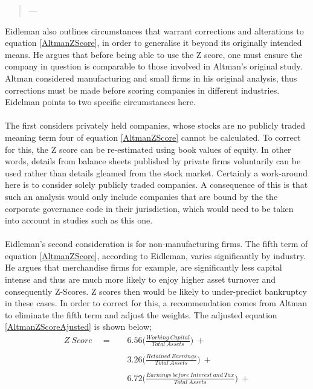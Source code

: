 {\begin {quote}
\hspace{2cm}---  \cite {eidleman1995z}
\end{quote}
Eidleman also outlines circumstances that warrant corrections and alterations to equation \ref{AltmanZScore}, in order to generalise it beyond its originally intended means. He argues that before being able to use the Z score, one must ensure the company in question is comparable to those involved in Altman's original study. Altman considered manufacturing and small firms in his original analysis, thus corrections must be made before scoring companies in different industries. Eidelman points to two specific circumstances here. \\\\
The first considers privately held companies, whose stocks are no publicly traded meaning term four of equation \ref{AltmanZScore} cannot be calculated. To correct for this, the Z score can be re-estimated using book values of equity. In other words, details from balance sheets published by private firms voluntarily can be used rather than details gleamed from the stock market. Certainly a work-around here is to consider solely publicly traded companies. A consequence of this is that such an analysis would only include companies that are bound by the the corporate governance code in their jurisdiction, which would need to be taken into account in studies such as this one.\\\\ Eidleman's second consideration is for non-manufacturing firms. The fifth term of equation \ref{AltmanZScore}, according to Eidleman, varies significantly by industry. He argues that merchandise firms for example, are significantly less capital intense and thus are much more likely to enjoy higher asset turnover and consequently Z-Scores. Z scores then would be likely to under-predict bankruptcy in these cases. In order to correct for this, a recommendation comes from Altman to eliminate the fifth term and adjust the weights. 
\clearpage
The adjusted equation \ref{AltmanZScoreAjusted} is shown below;
\begin {equation}\label{AltmanZScoreAjusted}
\begin{aligned}
Z \ Score \quad =  \quad & 6.56\bigg(\frac{Working \ Capital}{Total \ Assets}\bigg) \ + \\\\
		& 3.26\bigg({\frac{Retained \ Earnings}{Total \ Assets}}\bigg) \ + \\\\
		& 6.72\bigg({\frac{Earnings \ before \ Interest \ and \ Tax}{Total \ Assets}}\bigg) \ + \\\\

\end{aligned}
\end{equation}}
